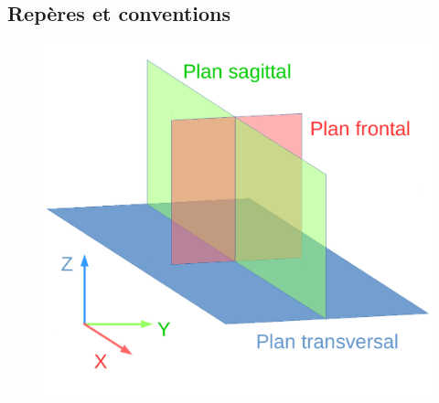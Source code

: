 \subsection{Repères et conventions\label{sec:model_conventions}}

\begin{figure}[htb]
    \begin{center}
        \begin{minipage}{0.6\linewidth}
            \includegraphics[type=pdf,ext=.pdf,read=.pdf,width=\linewidth]{../schema/planes}
        \end{minipage}
        \begin{minipage}{0.3\linewidth}

\end{minipage}
\end{center}
\end{figure}
